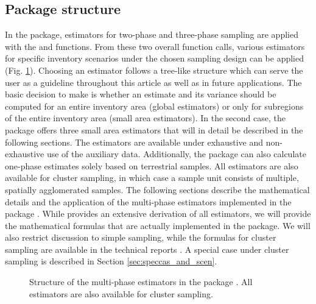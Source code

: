 
\subsection{Package structure}
\label{sec:packstruc}

In the  package, estimators for two-phase and three-phase sampling are applied with the  and  functions. From these two overall function calls, various estimators for specific inventory scenarios under the chosen sampling design can be applied (Fig. \ref{fig:struct_package}). Choosing an estimator follows a tree-like structure which can serve the user as a guideline throughout this article as well as in future applications. The basic decision to make is whether an estimate and its variance should be computed for an entire inventory area (global estimators) or only for subregions of the entire inventory area (small area estimators). In the second case, the package offers three small area estimators that will in detail be described in the following sections. The estimators are available under exhaustive and non-exhaustive use of the auxiliary data. Additionally, the package can also calculate one-phase estimates solely based on terrestrial samples. All estimators are also available for cluster sampling, in which case a sample unit consists of multiple, spatially agglomerated samples. The following sections describe the mathematical details and the application of the multi-phase estimators implemented in the  package . While \cite{mandallaz2008, mandallaz2013techa, mandallaz2013techb,mandallaz2015tech} provides an extensive derivation of all estimators, we will provide the mathematical formulas that are actually implemented in the package. We will also restrict discussion to simple sampling, while the formulas for cluster sampling are available in the technical reports \citep{mandallaz2016, mandallaz2013techa, mandallaz2013techb}. A special case under cluster sampling is described in Section \ref{sec:speccas_and_scen}.

\begin{figure}[htb]
\centering
{}
\caption{Structure of the multi-phase estimators in the  package . All estimators are also available for cluster sampling.}
\label{fig:struct_package}
\end{figure}

